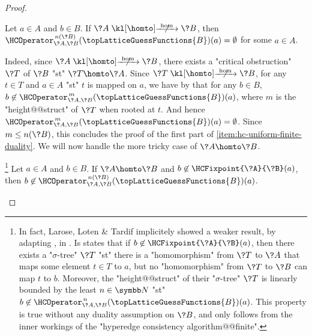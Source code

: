 \begin{proof}
	\begin{claim}%
		\AP\label{claim:hyperedge-consistency-uniform-convergence-no-hom}
		Let $a\in A$ and $b\in B$.
		If $\?A \nothomto \?B$, then $\HCOperator^{\,n(\?B)}_{\?A,\?B}(\topLatticeGuessFunctions{B})(a) = \emptyset$ for some $a \in A$.
	\end{claim}
	Indeed, since $\?A \nothomto \?B$, there exists a "critical obstruction" $\?T$ of $\?B$
	"st" $\?T \homto \?A$. Since $\?T \nothomto \?B$, for any $t \in T$ and $a\in A$
	"st" $t$ is mapped on $a$, we have by  that for any $b\in B$,
	$b \not\in \HCOperator^{\,m}_{\?A,\?B}(\topLatticeGuessFunctions{B})(a)$,
	where $m$ is the "height@@struct" of $\?T$ when rooted at $t$.
	And hence $\HCOperator^{\,m}_{\?A,\?B}(\topLatticeGuessFunctions{B})(a) = \emptyset$.
	Since $m \leq n(\?B)$, this concludes the proof of the first part of
	\eqref{item:hc-uniform-finite-duality}. We will now handle the more tricky case of
	$\?A \homto \?B$.
	
	\begin{claim}%
		\!\footnote{In fact, Larose, Loten \& Tardif implicitely showed a weaker result, by adapting
			\autocite[Theorem 21]{FederVardi1998ComputationalStructure}, in
			\autocite[Proof of Lemma 3.2]{LaroseLotenTardif2007CharacterisationFOCSP}.
			Is states that
			if $b \not\in \HCFixpoint{\?A}{\?B}(a)$, then there
			exists a "$\sigma$-tree" $\?T$ "st" there is a "homomorphism" from $\?T$ to $\?A$
			that maps some element $t \in T$ to $a$, but no "homomorphism" from $\?T$ to $\?B$
			can map $t$ to $b$. Moreover, the "height@@struct" of their "$\sigma$-tree" $\?T$ is linearly 
			bounded by the least $n\in \N$ "st"
			$b\not\in \HCOperator^{\,n}_{\?A,\?B}(\topLatticeGuessFunctions{B})(a)$.
			This property is true without any duality assumption on $\?B$, and only follows
			from the inner workings of the "hyperedge consistency algorithm@@finite".}%
		\AP\label{claim:hyperedge-consistency-uniform-convergence-hom}
		Let $a\in A$ and $b\in B$.
		If $\?A \homto \?B$ and $b \not\in \HCFixpoint{\?A}{\?B}(a)$,
		then $b \not\in \HCOperator^{\,n(\?B)}_{\?A,\?B}(\topLatticeGuessFunctions{B})(a)$.
	\end{claim}


\end{proof}

